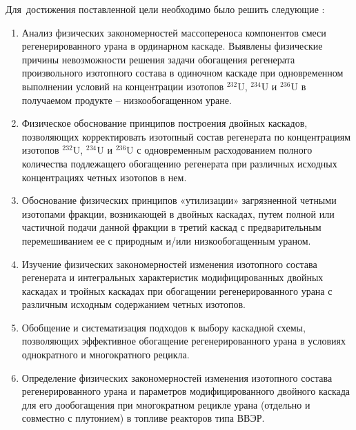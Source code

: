 Для~достижения поставленной цели необходимо было решить следующие {\tasks}:
\begin{enumerate}
  \item Анализ физических закономерностей массопереноса компонентов смеси
  регенерированного урана в ординарном каскаде. Выявлены физические причины
  невозможности решения задачи обогащения регенерата произвольного изотопного
  состава в одиночном каскаде при одновременном выполнении условий на
  концентрации изотопов $^{232}$U, $^{234}$U и $^{236}$U в получаемом продукте – низкообогащенном уране.
  \item Физическое обоснование принципов построения двойных каскадов,
  позволяющих корректировать изотопный состав регенерата по концентрациям
  изотопов $^{232}$U, $^{234}$U и $^{236}$U с одновременным расходованием полного количества
  подлежащего обогащению регенерата при различных исходных концентрациях
  четных изотопов в нем.
  \item Обоснование физических принципов «утилизации» загрязненной четными
  изотопами фракции, возникающей в двойных каскадах, путем полной или
  частичной подачи данной фракции в третий каскад с предварительным
  перемешиванием ее с природным и/или низкообогащенным ураном.
  \item Изучение физических закономерностей изменения изотопного состава регенерата и
  интегральных характеристик модифицированных двойных каскадах и тройных
  каскадах при обогащении регенерированного урана с различным исходным
  содержанием четных изотопов.
  \item Обобщение и систематизация подходов к выбору каскадной схемы, позволяющих
  эффективное обогащение регенерированного урана в условиях однократного и
  многократного рецикла.
  \item Определение физических закономерностей изменения изотопного состава
  регенерированного урана и параметров модифицированного двойного каскада для
  его дообогащения при многократном рецикле урана (отдельно и совместно с
  плутонием) в топливе реакторов типа ВВЭР.
\end{enumerate}


